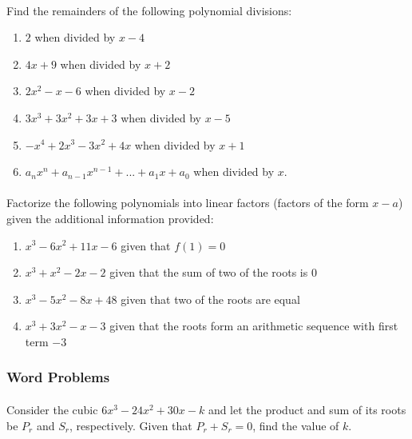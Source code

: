 \documentclass[12pt, a4paper, titlepage, twoside]{article}
\begin{document}
	\paragraph{}
	 Find the remainders of the following polynomial divisions:
	
	\begin{multicols}{2}
		\begin{enumerate}[label=\textbf{(\alph*)}]
			\item $2$ when divided by $x-4$
			\item $4x+9$ when divided by $x+2$
			\item $2x^2 - x - 6$ when divided by $x-2$\columnbreak
			\item $3x^3 + 3x^2 + 3x + 3$ when divided by $x-5$
			\item $-x^4 + 2x^3 - 3x^2 + 4x$ when divided by $x+1$
			\item $a_n x^n + a_{n-1} x^{n-1} + ... + a_1 x + a_0$ when divided by $x$.
		\end{enumerate}
	\end{multicols}
	
	\paragraph{}
	 Factorize the following polynomials into linear factors (factors of the form $x-a$) given the additional 
	information provided:
	
	\begin{multicols}{2}
		\begin{enumerate}[label=\textbf{(\alph*)}]
			\item $x^3 - 6x^2 + 11x - 6$ given that $f(1) = 0$
			\item $x^3 + x^2 - 2x - 2$ given that the sum of two of the roots is $0$
			\item $x^3 - 5x^2 - 8x + 48$ given that two of the roots are equal
			\item $x^3 + 3x^2 - x - 3$ given that the roots form an arithmetic sequence with first term $-3$
		\end{enumerate}
	\end{multicols}
	
	\subsubsection*{Word Problems}	
	
	\paragraph{}
	 Consider the cubic $6x^3 - 24x^2 + 30x - k$ and let the product and sum of its roots be
	$P_r$ and $S_r$, respectively. Given that $P_r + S_r = 0$, find the value of $k$.
	
\end{document}
